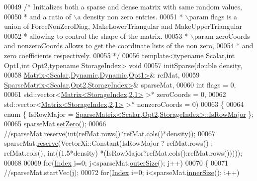 \begin{DoxyCode}
00049 \textcolor{comment}{/* Initializes both a sparse and dense matrix with same random values,}
00050 \textcolor{comment}{ * and a ratio of \(\backslash\)a density non zero entries.}
00051 \textcolor{comment}{ * \(\backslash\)param flags is a union of ForceNonZeroDiag, MakeLowerTriangular and MakeUpperTriangular}
00052 \textcolor{comment}{ *        allowing to control the shape of the matrix.}
00053 \textcolor{comment}{ * \(\backslash\)param zeroCoords and nonzeroCoords allows to get the coordinate lists of the non zero,}
00054 \textcolor{comment}{ *        and zero coefficients respectively.}
00055 \textcolor{comment}{ */}
00056 \textcolor{keyword}{template}<\textcolor{keyword}{typename} Scalar,\textcolor{keywordtype}{int} Opt1,\textcolor{keywordtype}{int} Opt2,\textcolor{keyword}{typename} StorageIndex> \textcolor{keywordtype}{void}
00057 initSparse(\textcolor{keywordtype}{double} density,
00058            \hyperlink{group___core___module_class_eigen_1_1_matrix}{Matrix<Scalar,Dynamic,Dynamic,Opt1>}& refMat,
00059            \hyperlink{group___sparse_core___module_class_eigen_1_1_sparse_matrix}{SparseMatrix<Scalar,Opt2,StorageIndex>}& sparseMat,
00060            \textcolor{keywordtype}{int} flags = 0,
00061            std::vector<\hyperlink{group___core___module_class_eigen_1_1_matrix}{Matrix<StorageIndex,2,1>} >* zeroCoords = 0,
00062            std::vector<\hyperlink{group___core___module_class_eigen_1_1_matrix}{Matrix<StorageIndex,2,1>} >* nonzeroCoords = 0)
00063 \{
00064   \textcolor{keyword}{enum} \{ IsRowMajor = \hyperlink{group___sparse_core___module_class_eigen_1_1_sparse_matrix}{SparseMatrix<Scalar,Opt2,StorageIndex>::IsRowMajor}
       \};
00065   sparseMat.\hyperlink{group___sparse_core___module_ad3c7416090f913e8685523cb3ab7c2f7}{setZero}();
00066   \textcolor{comment}{//sparseMat.reserve(int(refMat.rows()*refMat.cols()*density));}
00067   sparseMat.\hyperlink{group___sparse_core___module_a1518e58ac49bed0e2385b722a034f7d3}{reserve}(VectorXi::Constant(IsRowMajor ? refMat.rows() : refMat.cols(), int((1.5*density)
      *(IsRowMajor?refMat.cols():refMat.rows()))));
00068   
00069   \textcolor{keywordflow}{for}(\hyperlink{namespace_eigen_a62e77e0933482dafde8fe197d9a2cfde}{Index} j=0; j<sparseMat.\hyperlink{group___sparse_core___module_a4e5f706cfae14d2eaec1ea1e234905f1}{outerSize}(); j++)
00070   \{
00071     \textcolor{comment}{//sparseMat.startVec(j);}
00072     \textcolor{keywordflow}{for}(\hyperlink{namespace_eigen_a62e77e0933482dafde8fe197d9a2cfde}{Index} i=0; i<sparseMat.\hyperlink{group___sparse_core___module_a0f42824d4a06ee1d1f6afbc4551c5896}{innerSize}(); i++)

\end{DoxyCode}
